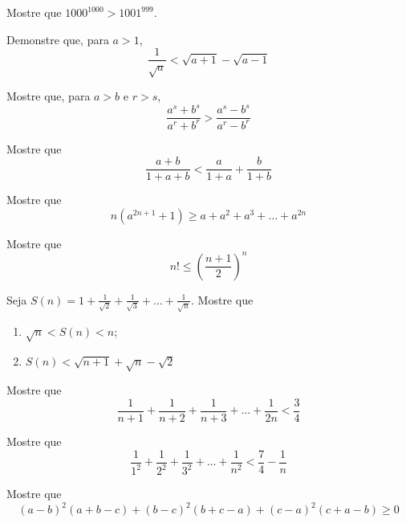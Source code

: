 \begin{questao}
  Mostre que $1000^{1000} > 1001^{999}$.
\end{questao}

\begin{questao}
  Demonstre que, para $a>1$, $$ \frac{1}{\sqrt{a}} < \sqrt{a+1} - \sqrt{a-1} $$
\end{questao}

\begin{questao}
  Mostre que, para $a>b$ e $r>s$, $$ \frac{a^s+b^s}{a^r+b^r} >
  \frac{a^s-b^s}{a^r-b^r} $$
\end{questao}

\begin{questao}
  Mostre que $$ \frac{a+b}{1+a+b} < \frac{a}{1+a} + \frac{b}{1+b} $$
\end{questao}

\begin{questao}
  Mostre que $$ n(a^{2n+1}+1) \geq a+a^2+a^3+\ldots+a^{2n} $$
\end{questao}

\begin{questao}
  Mostre que $$ n! \leq \left( \frac{n+1}{2} \right)^n $$
\end{questao}

\begin{questao}
  Seja $ S(n) =
  1+\frac{1}{\sqrt{2}}+\frac{1}{\sqrt{3}}+\ldots+\frac{1}{\sqrt{n}} $. Mostre
  que

  \begin{enumerate}

  \item $ \sqrt{n} < S(n) < n $;

  \item $ S(n) < \sqrt{n+1} + \sqrt{n} - \sqrt{2} $
  \end{enumerate}

\end{questao}

\begin{questao}
  Mostre que $$ \frac{1}{n+1} + \frac{1}{n+2} + \frac{1}{n+3} + \ldots +
  \frac{1}{2n} < \frac{3}{4} $$
\end{questao}

\begin{questao}
  Mostre que $$ \frac{1}{1^2} + \frac{1}{2^2} + \frac{1}{3^2} + \ldots +
  \frac{1}{n^2} < \frac{7}{4} - \frac{1}{n} $$
\end{questao}

\begin{questao}
  Mostre que $$ (a-b)^2(a+b-c) + (b-c)^2(b+c-a) + (c-a)^2(c+a-b) \geq 0 $$
\end{questao}

